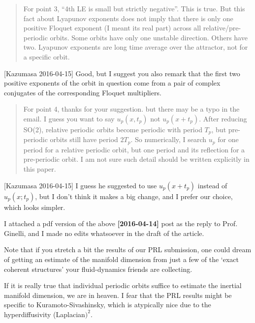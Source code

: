 \begin{description}
\begin{quotation}
  For point 3, ``4th LE is small but strictly negative''. This is true.
  But this fact about Lyapunov exponents does not imply that there is
  only one positive Floquet exponent (I meant its real part) across all
  relative/pre-periodic orbits. Some orbits have only one unstable direction.
  Others have two. Lyapunov exponents are long time average over the attractor,
  not for a specific orbit.
\end{quotation}
[Kazumasa 2016-04-15]
Good, but I suggest you also remark that the first two positive
exponents of the orbit in question come from a pair of complex
conjugates of the corresponding Floquet multipliers.

\begin{quotation}
  For point 4, thanks for your suggestion. but there may be a typo
  in the email. I guess you want to say $u_p(x, t_p)$ not $u_p(x+t_p)$.
  After reducing SO(2), relative periodic orbits become periodic with period
  $T_p$, but pre-periodic orbits still have period $2T_p$. So numerically, I
  search $u_p$ for one period for a relative periodic orbit, but one period
  and its reflection for a pre-periodic orbit. I am not sure such detail should
  be written explicitly in this paper.
\end{quotation}
[Kazumasa 2016-04-15]
I guess he suggested to use $u_p(x + t_p)$ instead of $u_p(x; t_p)$, but I don't
think it makes a big change, and I prefer our choice, which looks simpler.

\renewcommand{\edit}[1]{{\color{blue} #1}} %


\item[Xiong 2016-04-19]
I attached a pdf version of the above {\bf [2016-04-14]} post as  the
reply to Prof. Ginelli, and I made no edits whatsoever in the draft of
the article.

\item[2016-04-28 Hugues]
Note that if you stretch a bit the results of our PRL submission, one
could dream of getting an estimate of the manifold dimension from just a
few of the `exact coherent structures' your fluid-dynamics friends are
collecting.

\item[2016-04-28 Predrag]
If it is really true that individual periodic orbits suffice to estimate
the inertial manifold dimension, we are in heaven. I fear that the PRL
results might be specific to Kuramoto-Sivashinsky, which is atypically
nice due to the hyperdiffusivity (Laplacian$)^2$.


\end{description}

